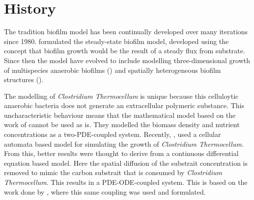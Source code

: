 \section{History}

The tradition biofilm model has been continually developed over many iterations since 1980.
\cite{rittmann1980model} formulated the steady-state biofilm model, developed using the concept that biofilm growth would be the result of a steady flux from substrate.
Since then the model have evolved to include modelling three-dimensional growth of multispecies anaerobic biofilms (\cite{noguera1999simulation}) and spatially heterogeneous biofilm structures (\cite{eberl2001deterministic}). 

The modelling of \textit{Clostridium Thermocellum} is unique because this celluloytic anaerobic bacteria does not generate an extracellular polymeric substance.
This uncharacteristic behaviour means that the mathematical model based on the work of \cite{eberl2007finite} cannot be used as is. 
They modelled the biomass density and nutrient concentrations as a two-PDE-coupled system.
Recently, \cite{wang2011spatial}, used a cellular automata based model for simulating the growth of \textit{Clostridium Thermocellum}. From this, better results were thought to derive from a continuous differential equation based model.
Here the spatial diffusion of the substrait concentration is removed to mimic the carbon substrait that is consumed by \textit{Clostridium Thermocellum}. This results in a PDE-ODE-coupled system.
This is based on the work done by \cite{dumitrache2014understanding}, where this same coupling was used and formulated.
